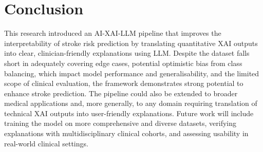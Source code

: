 \section{Conclusion} \label{sec:conclusion}
This research introduced an AI-XAI-LLM pipeline that improves the interpretability of stroke risk prediction by translating quantitative XAI outputs into clear, clinician-friendly explanations using LLM. Despite the dataset falls short in adequately covering edge cases, potential optimistic bias from class balancing, which impact model performance and generalisability, and the limited scope of clinical evaluation, the framework demonstrates strong potential to enhance stroke prediction. The pipeline could also be extended to broader medical applications and, more generally, to any domain requiring translation of technical XAI outputs into user-friendly explanations. Future work will include training the model on more comprehensive and diverse datasets, verifying explanations with multidisciplinary clinical cohorts, and assessing usability in real-world clinical settings.